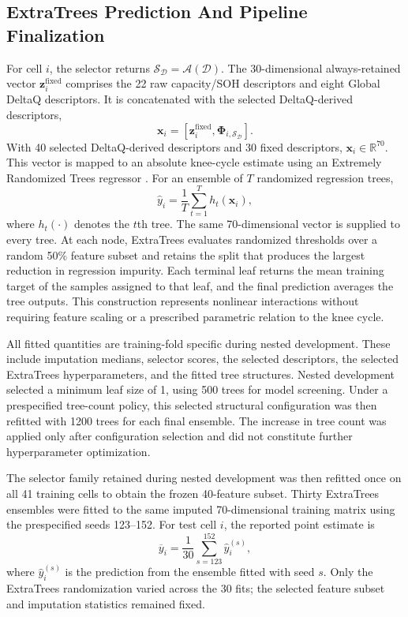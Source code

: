\documentclass[pdflatex,sn-mathphys-num]{sn-jnl}
\begin{document}
\subsection{ExtraTrees Prediction And Pipeline Finalization}\label{subsec:ldqet_prediction}

For cell $i$, the selector returns $\mathcal{S}_{\mathcal{D}}=\mathcal{A}(\mathcal{D})$. The 30-dimensional always-retained vector $\mathbf{z}_i^{\mathrm{fixed}}$ comprises the 22 raw capacity/SOH descriptors and eight Global DeltaQ descriptors. It is concatenated with the selected DeltaQ-derived descriptors,
\begin{equation}
\mathbf{x}_i =
\left[\mathbf{z}_i^{\mathrm{fixed}},
\boldsymbol{\Phi}_{i,\mathcal{S}_{\mathcal{D}}}\right].
\end{equation}
With 40 selected DeltaQ-derived descriptors and 30 fixed descriptors, $\mathbf{x}_i\in\mathbb{R}^{70}$. This vector is mapped to an absolute knee-cycle estimate using an Extremely Randomized Trees regressor \cite{geurts2006extremely}. For an ensemble of $T$ randomized regression trees,
\begin{equation}
\hat{y}_i = \frac{1}{T}\sum_{t=1}^{T} h_t(\mathbf{x}_i),
\end{equation}
where $h_t(\cdot)$ denotes the $t$th tree. The same 70-dimensional vector is supplied to every tree. At each node, ExtraTrees evaluates randomized thresholds over a random 50\% feature subset and retains the split that produces the largest reduction in regression impurity. Each terminal leaf returns the mean training target of the samples assigned to that leaf, and the final prediction averages the tree outputs. This construction represents nonlinear interactions without requiring feature scaling or a prescribed parametric relation to the knee cycle.

All fitted quantities are training-fold specific during nested development. These include imputation medians, selector scores, the selected descriptors, the selected ExtraTrees hyperparameters, and the fitted tree structures. Nested development selected a minimum leaf size of 1, using 500 trees for model screening. Under a prespecified tree-count policy, this selected structural configuration was then refitted with 1200 trees for each final ensemble. The increase in tree count was applied only after configuration selection and did not constitute further hyperparameter optimization. 

The selector family retained during nested development was then refitted once on all 41 training cells to obtain the frozen 40-feature subset. Thirty ExtraTrees ensembles were fitted to the same imputed 70-dimensional training matrix using the prespecified seeds 123--152. For test cell $i$, the reported point estimate is
\begin{equation}
\overline{y}_i=
\frac{1}{30}\sum_{s=123}^{152}\widehat{y}_i^{(s)},
\end{equation}
where $\widehat{y}_i^{(s)}$ is the prediction from the ensemble fitted with seed $s$. Only the ExtraTrees randomization varied across the 30 fits; the selected feature subset and imputation statistics remained fixed.
\end{document}
